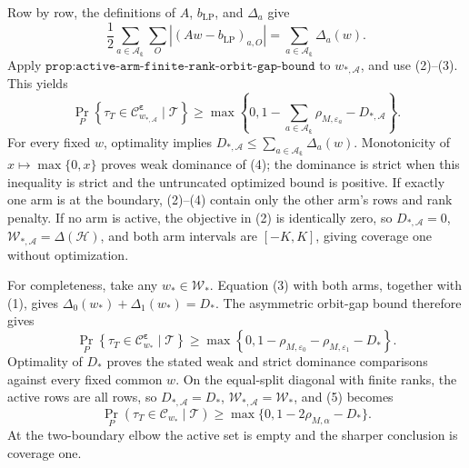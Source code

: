 Row by row, the definitions of \(A\), \(b_{\mathrm{LP}}\), and \(\Delta_a\) give
\[
\frac12\sum_{a\in\mathcal A_{\boldsymbol\varepsilon}}\sum_O|(Aw-b_{\mathrm{LP}})_{a,O}|
=\sum_{a\in\mathcal A_{\boldsymbol\varepsilon}}\Delta_a(w).
\tag{3}
\]
Apply \(\texttt{prop:active-arm-finite-rank-orbit-gap-bound}\) to \(w_{*,\mathcal A}\), and use (2)--(3). This yields
\[
\Pr_P\!\left\{\tau_T\in\mathcal C^{\boldsymbol\varepsilon}_{w_{*,\mathcal A}}\mid\mathcal T\right\}
\ge\max\!\left\{0,1-\sum_{a\in\mathcal A_{\boldsymbol\varepsilon}}\rho_{M,\varepsilon_a}-D_{*,\mathcal A}\right\}.
\tag{4}
\]
For every fixed \(w\), optimality implies \(D_{*,\mathcal A}\le\sum_{a\in\mathcal A_{\boldsymbol\varepsilon}}\Delta_a(w)\). Monotonicity of \(x\mapsto\max\{0,x\}\) proves weak dominance of (4); the dominance is strict when this inequality is strict and the untruncated optimized bound is positive. If exactly one arm is at the boundary, (2)--(4) contain only the other arm's rows and rank penalty. If no arm is active, the objective in (2) is identically zero, so \(D_{*,\mathcal A}=0\), \(\mathcal W_{*,\mathcal A}=\Delta(\mathcal H)\), and both arm intervals are \([-K,K]\), giving coverage one without optimization.

For completeness, take any \(w_*\in\mathcal W_*\). Equation (3) with both arms, together with (1), gives \(\Delta_0(w_*)+\Delta_1(w_*)=D_*\). The asymmetric orbit-gap bound therefore gives
\[
\Pr_P\!\left\{\tau_T\in\mathcal C^{\boldsymbol\varepsilon}_{w_*}\mid\mathcal T\right\}
\ge\max\!\left\{0,1-\rho_{M,\varepsilon_0}-\rho_{M,\varepsilon_1}-D_*\right\}.
\tag{5}
\]
Optimality of \(D_*\) proves the stated weak and strict dominance comparisons against every fixed common \(w\). On the equal-split diagonal with finite ranks, the active rows are all rows, so \(D_{*,\mathcal A}=D_*\), \(\mathcal W_{*,\mathcal A}=\mathcal W_*\), and (5) becomes
\[
\Pr_P(\tau_T\in\mathcal C_{w_*}\mid\mathcal T)\ge\max\{0,1-2\rho_{M,\alpha}-D_*\}.
\]
At the two-boundary elbow the active set is empty and the sharper conclusion is coverage one.